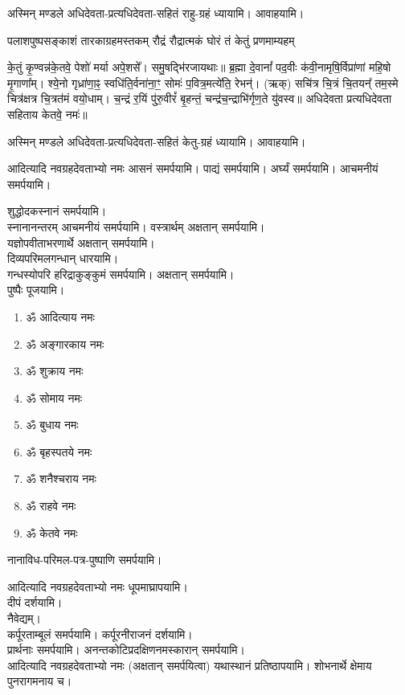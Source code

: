 अस्मिन् मण्डले अधिदेवता-प्रत्यधिदेवता-सहितं राहु-ग्रहं ध्यायामि। आवाहयामि।

\twolineshloka
{पलाशपुष्पसङ्काशं तारकाग्रहमस्तकम्}
{रौद्रं रौद्रात्मकं घोरं तं केतुं प्रणमाम्यहम्}

के॒तुं कृ॒ण्वन्न॑के॒तवे॒ पेशो॑ मर्या अपे॒शसे᳚। समु॒षद्भि॑रजायथाः॥ ब्र॒ह्मा दे॒वानां᳚ पद॒वीः
क॑वी॒नामृषि॒र्विप्रा॑णां महि॒षो मृ॒गाणा᳚म्। श्ये॒नो गृध्रा॑णा॒ꣴ॒ स्वधि॑ति॒र्वना॑ना॒ꣳ॒ सोमः॑
प॒वित्र॒मत्ये॑ति॒ रेभन्॑। (ऋक्) सचि॑त्र चि॒त्रं चि॒तयन्᳚ तम॒स्मे चित्र॑क्षत्र चि॒त्रत॑मं वयो॒धाम्।
च॒न्द्रं र॒यिं पु॑रु॒वीरं᳚ बृ॒हन्तं॒ चन्द्र॑च॒न्द्राभि॑र्गृण॒ते यु॑वस्व॥  अधिदेवता प्रत्यधिदेवता
सहिताय केतवे॒ नमः॑॥ 

अस्मिन् मण्डले अधिदेवता-प्रत्यधिदेवता-सहितं केतु-ग्रहं ध्यायामि। आवाहयामि।

आदित्यादि नवग्रहदेवताभ्यो नमः आसनं समर्पयामि।
पाद्यं समर्पयामि। अर्घ्यं समर्पयामि। आचमनीयं समर्पयामि। 

शुद्धोदकस्नानं समर्पयामि।\\
स्नानानन्तरम् आचमनीयं समर्पयामि।
वस्त्रार्थम् अक्षतान् समर्पयामि।\\
यज्ञोपवीताभरणार्थे अक्षतान् समर्पयामि।\\
दिव्यपरिमलगन्धान् धारयामि।\\
गन्धस्योपरि हरिद्राकुङ्कुमं समर्पयामि। अक्षतान् समर्पयामि। \\
पुष्पैः पूजयामि।

\begin{enumerate}%
\item ॐ आदित्याय नमः
\item ॐ अङ्गारकाय नमः
\item ॐ शुक्राय नमः
\item ॐ सोमाय नमः
\item ॐ बुधाय नमः
\item ॐ बृहस्पतये नमः
\item ॐ शनैश्चराय नमः
\item ॐ राहवे नमः
\item ॐ केतवे नमः
\end{enumerate}

नानाविध-परिमल-पत्र-पुष्पाणि समर्पयामि।

आदित्यादि नवग्रहदेवताभ्यो नमः धूपमाघ्रापयामि।\\
दीपं दर्शयामि।\\
नैवेद्यम्। \\
कर्पूरताम्बूलं समर्पयामि। कर्पूरनीराजनं दर्शयामि।\\
प्रार्थनाः समर्पयामि।
अनन्तकोटिप्रदक्षिणनमस्कारान् समर्पयामि।\\

आदित्यादि नवग्रहदेवताभ्यो नमः (अक्षतान् समर्पयित्वा) यथास्थानं प्रतिष्ठापयामि। शोभनार्थे क्षेमाय पुनरागमनाय च।
